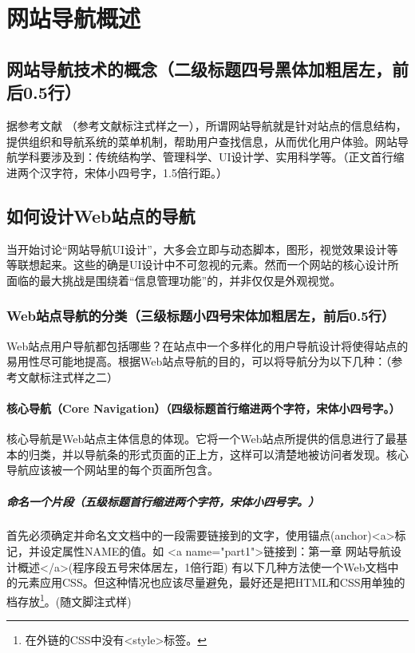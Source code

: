 \newpage
\section{网站导航概述}
\subsection{网站导航技术的概念（二级标题四号黑体加粗居左，前后0.5行）}
\par 据参考文献 \citep{Naidu1989Evaluation}（参考文献标注式样之一），所谓网站导航就是针对站点的信息结构，提供组织和导航系统的菜单机制，帮助用户查找信息，从而优化用户体验。网站导航学科要涉及到：传统结构学、管理科学、UI设计学、实用科学等。（正文首行缩进两个汉字符，宋体小四号字，1.5倍行距。）
\subsection{如何设计Web站点的导航}
\par 当开始讨论“网站导航UI设计”，大多会立即与动态脚本，图形，视觉效果设计等等联想起来。这些的确是UI设计中不可忽视的元素。然而一个网站的核心设计所面临的最大挑战是围绕着“信息管理功能”的，并非仅仅是外观视觉。
\subsubsection{Web站点导航的分类（三级标题小四号宋体加粗居左，前后0.5行）}
\par Web站点用户导航都包括哪些？在站点中一个多样化的用户导航设计将使得站点的易用性尽可能地提高。根据Web站点导航的目的，可以将导航分为以下几种：（参考文献标注式样之二）
\paragraph{核心导航（Core Navigation）（四级标题首行缩进两个字符，宋体小四号字。）} 
\par 核心导航是Web站点主体信息的体现。它将一个Web站点所提供的信息进行了最基本的归类，并以导航条的形式页面的正上方，这样可以清楚地被访问者发现。核心导航应该被一个网站里的每个页面所包含。
\subparagraph{命名一个片段（五级标题首行缩进两个字符，宋体小四号字。）}
 首先必须确定并命名文文档中的一段需要链接到的文字，使用锚点(anchor)<a>标记，并设定属性NAME的值。如
<a name="part1">链接到：第一章 网站导航设计概述</a>(程序段五号宋体居左，1倍行距)
有以下几种方法使一个Web文档中的元素应用CSS。但这种情况也应该尽量避免，最好还是把HTML和CSS用单独的档存放\footnote{在外链的CSS中没有<style>标签。}。(随文脚注式样)
